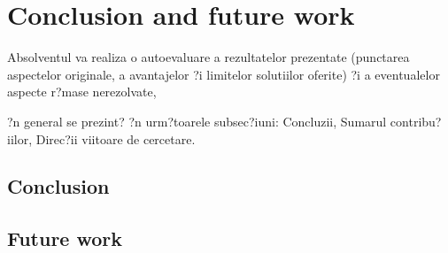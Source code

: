 

\chapter{Conclusion and future work}
\label{CapCF}

Absolventul va realiza o autoevaluare a rezultatelor prezentate (punctarea aspectelor originale, a avantajelor ?i limitelor solutiilor oferite) ?i a eventualelor aspecte r?mase nerezolvate,

?n general se prezint? ?n urm?toarele subsec?iuni: Concluzii, Sumarul contribu?iilor, Direc?ii viitoare de cercetare.

\section{Conclusion}

\section{Future work}


